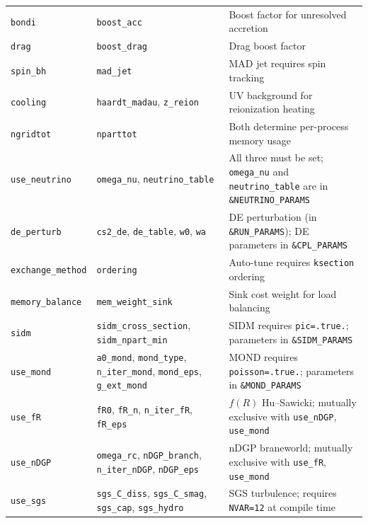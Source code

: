\begin{longtable}{@{}p{4cm}p{4.5cm}p{6.5cm}@{}}
\addlinespace
\texttt{bondi}
  & \texttt{boost\_acc}
  & Boost factor for unresolved accretion \\
\addlinespace
\texttt{drag}
  & \texttt{boost\_drag}
  & Drag boost factor \\
\addlinespace
\texttt{spin\_bh}
  & \texttt{mad\_jet}
  & MAD jet requires spin tracking \\
\addlinespace
\texttt{cooling}
  & \texttt{haardt\_madau}, \texttt{z\_reion}
  & UV background for reionization heating \\
\addlinespace
\texttt{ngridtot}
  & \texttt{nparttot}
  & Both determine per-process memory usage \\
\addlinespace
\texttt{use\_neutrino}
  & \texttt{omega\_nu}, \texttt{neutrino\_table}
  & All three must be set; \texttt{omega\_nu} and \texttt{neutrino\_table} are in \texttt{\&NEUTRINO\_PARAMS} \\
\addlinespace
\texttt{de\_perturb}
  & \texttt{cs2\_de}, \texttt{de\_table}, \texttt{w0}, \texttt{wa}
  & DE perturbation (in \texttt{\&RUN\_PARAMS}); DE parameters in \texttt{\&CPL\_PARAMS} \\
\addlinespace
\texttt{exchange\_method}
  & \texttt{ordering}
  & Auto-tune requires \texttt{ksection} ordering \\
\addlinespace
\texttt{memory\_balance}
  & \texttt{mem\_weight\_sink}
  & Sink cost weight for load balancing \\
\addlinespace
\texttt{sidm}
  & \texttt{sidm\_cross\_section}, \texttt{sidm\_npart\_min}
  & SIDM requires \texttt{pic=.true.}; parameters in \texttt{\&SIDM\_PARAMS} \\
\addlinespace
\texttt{use\_mond}
  & \texttt{a0\_mond}, \texttt{mond\_type}, \texttt{n\_iter\_mond}, \texttt{mond\_eps}, \texttt{g\_ext\_mond}
  & MOND requires \texttt{poisson=.true.}; parameters in \texttt{\&MOND\_PARAMS} \\
\addlinespace
\texttt{use\_fR}
  & \texttt{fR0}, \texttt{fR\_n}, \texttt{n\_iter\_fR}, \texttt{fR\_eps}
  & $f(R)$ Hu--Sawicki; mutually exclusive with \texttt{use\_nDGP}, \texttt{use\_mond} \\
\addlinespace
\texttt{use\_nDGP}
  & \texttt{omega\_rc}, \texttt{nDGP\_branch}, \texttt{n\_iter\_nDGP}, \texttt{nDGP\_eps}
  & nDGP braneworld; mutually exclusive with \texttt{use\_fR}, \texttt{use\_mond} \\
\addlinespace
\texttt{use\_sgs}
  & \texttt{sgs\_C\_diss}, \texttt{sgs\_C\_smag}, \texttt{sgs\_cap}, \texttt{sgs\_hydro}
  & SGS turbulence; requires \texttt{NVAR=12} at compile time \\

\end{longtable}
